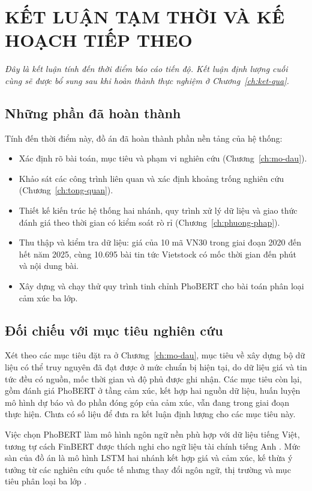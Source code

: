 \chapter{KẾT LUẬN TẠM THỜI VÀ KẾ HOẠCH TIẾP THEO}
\label{ch:ket-luan}

\emph{Đây là kết luận tính đến thời điểm báo cáo tiến độ. Kết luận định lượng cuối cùng
sẽ được bổ sung sau khi hoàn thành thực nghiệm ở Chương~\ref{ch:ket-qua}.}

\section{Những phần đã hoàn thành}

Tính đến thời điểm này, đồ án đã hoàn thành phần nền tảng của hệ thống:

\begin{itemize}[nosep]
  \item Xác định rõ bài toán, mục tiêu và phạm vi nghiên cứu (Chương~\ref{ch:mo-dau}).
  \item Khảo sát các công trình liên quan và xác định khoảng trống nghiên cứu
        (Chương~\ref{ch:tong-quan}).
  \item Thiết kế kiến trúc hệ thống hai nhánh, quy trình xử lý dữ liệu và giao thức đánh
        giá theo thời gian có kiểm soát rò rỉ (Chương~\ref{ch:phuong-phap}).
  \item Thu thập và kiểm tra dữ liệu: giá của 10 mã VN30 trong giai đoạn 2020 đến hết năm
        2025, cùng 10.695 bài tin tức Vietstock có mốc thời gian đến phút và nội dung bài.
  \item Xây dựng và chạy thử quy trình tinh chỉnh PhoBERT cho bài toán phân loại cảm xúc ba lớp.
\end{itemize}

\section{Đối chiếu với mục tiêu nghiên cứu}

Xét theo các mục tiêu đặt ra ở Chương~\ref{ch:mo-dau}, mục tiêu về xây dựng bộ dữ liệu
có thể truy nguyên đã đạt được ở mức chuẩn bị hiện tại, do dữ liệu giá và tin tức đều có
nguồn, mốc thời gian và độ phủ được ghi nhận. Các mục tiêu còn lại, gồm đánh giá PhoBERT
ở tầng cảm xúc, kết hợp hai nguồn dữ liệu, huấn luyện mô hình dự báo và đo phần đóng góp
của cảm xúc, vẫn đang trong giai đoạn thực hiện. Chưa có số liệu để đưa ra kết luận
định lượng cho các mục tiêu này.

Việc chọn PhoBERT làm mô hình ngôn ngữ nền phù hợp với dữ liệu tiếng Việt, tương tự cách
FinBERT được thích nghi cho ngữ liệu tài chính tiếng Anh
\cite{Nguyen2020_200300744v3,Yang2020_200608097v2}. Mức sàn của đồ án là mô hình LSTM hai
nhánh kết hợp giá và cảm xúc, kế thừa ý tưởng từ các nghiên cứu quốc tế nhưng thay đổi
ngôn ngữ, thị trường và mục tiêu phân loại ba lớp
\cite{Halder2022_221107392v1,Gu2024_240716150v1}.

